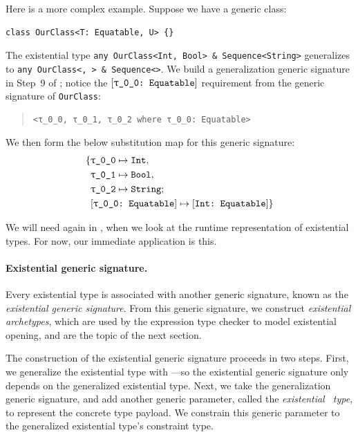 \documentclass[../generics]{subfiles}
\begin{document}
\begin{example}\label{ex:generalize existential 2}
Here is a more complex example. Suppose we have a generic class:
\begin{Verbatim}
class OurClass<T: Equatable, U> {}
\end{Verbatim}
The existential type \texttt{any OurClass<Int, Bool> \& Sequence<String>} generalizes to \texttt{any OurClass<\rT, \rU> \& Sequence<\rV>}. We build a generalization generic signature in Step~9 of ; notice the $\ConfReq{\rT}{Equatable}$ requirement from the generic signature of \texttt{OurClass}:
\begin{quote}
\begin{verbatim}
<τ_0_0, τ_0_1, τ_0_2 where τ_0_0: Equatable>
\end{verbatim}
\end{quote}
We then form the below substitution map for this generic signature:
\begin{align*}
\SubstMapC{&\SubstType{\rT}{Int},\\
& \SubstType{\rU}{Bool},\\
& \SubstType{\rV}{String}}{\\
& \SubstConf{\rT}{Int}{Equatable}}
\end{align*}
\end{example}

We will need  again in , when we look at the runtime representation of existential types. For now, our immediate application is this.

\paragraph{Existential generic  signature.}
Every existential type is associated with another generic signature, known as the \emph{existential generic signature}. From this generic signature, we construct \emph{existential archetypes}, which are used by the expression type checker to model existential opening, and are the topic of the next section.

The construction of the existential generic signature proceeds in two steps. First, we generalize the existential type with ---so the existential generic signature only depends on the generalized existential type. Next, we take the generalization generic signature, and add another generic parameter, called the \emph{existential \tSelf\ type}, to represent the concrete type payload. We constrain this generic parameter to the generalized existential type's constraint type.
\end{document}
